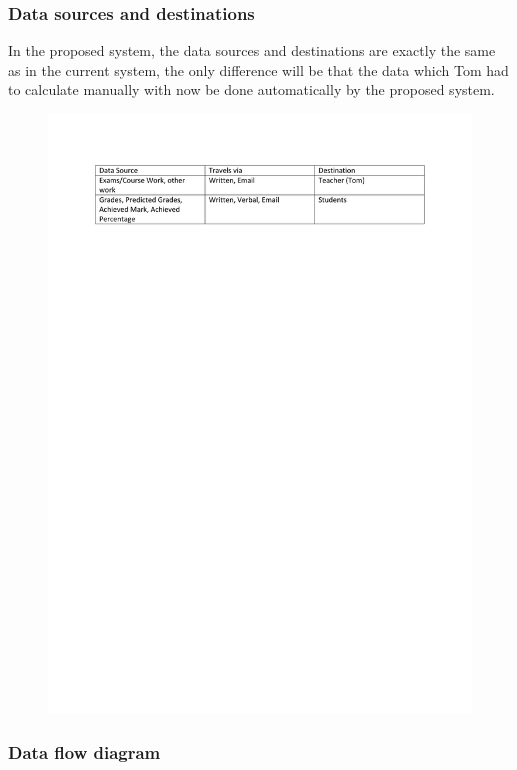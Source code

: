 \subsubsection{Data sources and destinations}

In the proposed system, the data sources and destinations are exactly the same as in the current system, the only difference will be that the data which Tom had to calculate manually with now be done automatically by the proposed system.

\begin{figure}[H]
    \includegraphics[width=\textwidth]{./Analysis/images/DataSourcesandDestinations.pdf}
\end{figure} 

\subsubsection{Data flow diagram}

